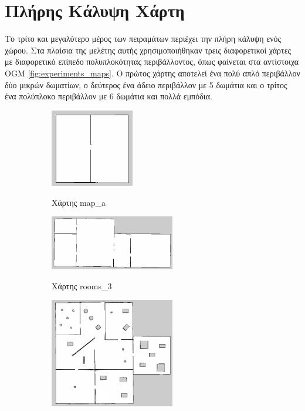 \section{Πλήρης Κάλυψη Χάρτη}
\label{sec:experiments_coverage}

Το τρίτο και μεγαλύτερο μέρος των πειραμάτων περιέχει την πλήρη κάλυψη ενός χώρου. Στα πλαίσια της μελέτης αυτής χρησιμοποιήθηκαν τρεις διαφορετικοί χάρτες με διαφορετικό επίπεδο πολυπλοκότητας περιβάλλοντος, όπως φαίνεται στα αντίστοιχα OGM \ref{fig:experiments_maps}. Ο πρώτος χάρτης αποτελεί ένα πολύ απλό περιβάλλον δύο μικρών δωματίων, ο δεύτερος ένα άδειο περιβάλλον με 5 δωμάτια και ο τρίτος ένα πολύπλοκο περιβάλλον με 6 δωμάτια και πολλά εμπόδια.


\begin{figure}
     \centering
     \begin{subfigure}[b]{\textwidth}
         \centering
         \includegraphics[width=0.4\textwidth]{./images/chapter6/map_a_ogm.png}
         \label{fig:map_a_ogm}
         \caption{Χάρτης map\_a}
     \end{subfigure}
     \hfill
     \begin{subfigure}[b]{\textwidth}
         \centering
         \includegraphics[width=0.6\textwidth]{./images/chapter6/rooms_3_ogm.png}
         \label{fig:rooms_3_ogm}
         \caption{Χάρτης rooms\_3}
     \end{subfigure}
     \hfill
     \begin{subfigure}[b]{\textwidth}
         \centering
         \includegraphics[width=0.6\textwidth]{./images/chapter6/indoors_with_features_ogm.png}

\end{subfigure}
\end{figure}
